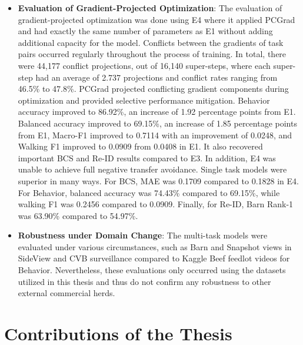 \begin{itemize}
    \item \textbf{Evaluation of Gradient-Projected Optimization}: The evaluation of gradient-projected optimization was done using E4 where it applied PCGrad and had exactly the same number of parameters as E1 without adding additional capacity for the model. Conflicts between the gradients of task pairs occurred regularly throughout the process of training. In total, there were 44,177 conflict projections, out of 16,140 super-steps, where each super-step had an average of 2.737 projections and conflict rates ranging from 46.5\% to 47.8\%. PCGrad projected conflicting gradient components during optimization and provided selective performance mitigation. Behavior accuracy improved to 86.92\%, an increase of 1.92 percentage points from E1. Balanced accuracy improved to 69.15\%, an increase of 1.85 percentage points from E1, Macro-F1 improved to 0.7114 with an improvement of 0.0248, and Walking F1 improved to 0.0909 from 0.0408 in E1. It also recovered important BCS and Re-ID results compared to E3. In addition, E4 was unable to achieve full negative transfer avoidance. Single task models were superior in many ways. For BCS, MAE was 0.1709 compared to 0.1828 in E4. For Behavior, balanced accuracy was 74.43\% compared to 69.15\%, while walking F1 was 0.2456 compared to 0.0909. Finally, for Re-ID, Barn Rank-1 was 63.90\% compared to 54.97\%.
    \item \textbf{Robustness under Domain Change}: The multi-task models were evaluated under various circumstances, such as Barn and Snapshot views in SideView and CVB surveillance compared to Kaggle Beef feedlot videos for Behavior. Nevertheless, these evaluations only occurred using the datasets utilized in this thesis and thus do not confirm any robustness to other external commercial herds.
\end{itemize}

\section{Contributions of the Thesis}

